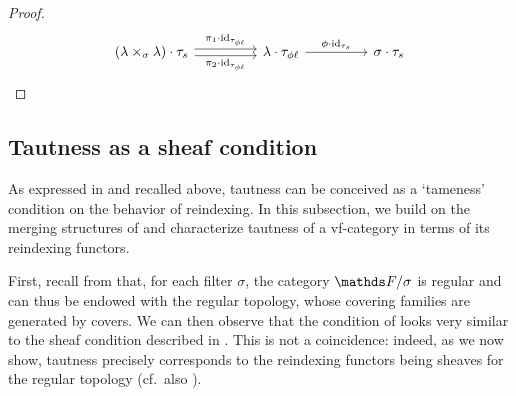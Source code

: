 \begin{prop}
\begin{proof}
\[\begin{tikzcd}[sep = 45pt]
	{(\lambda \times_\sigma \lambda)\cdot \tau_s} & {\lambda\cdot \tau_{\phi\ell}} & {\sigma\cdot \tau_s}
	\arrow["{\pi_1\cdot\operatorname{id}_{\tau_{\phi \ell}}}", shift left, from=1-1, to=1-2]
	\arrow["{\pi_2\cdot\operatorname{id}_{\tau_{\phi \ell}}}"', shift right, from=1-1, to=1-2]
	\arrow["{\phi\cdot \operatorname{id}_{\tau_s}}", from=1-2, to=1-3]
\end{tikzcd}\qedhere\]
    \end{proof}
\end{prop}

\subsection{Tautness as a sheaf condition}\label{ssec:tautness-sheaf}
As expressed in \cite{saadiaGeometricMorphismsVirtual2026} and recalled above, tautness can be conceived as a `tameness' condition on the behavior of reindexing.
In this subsection, we build on the merging structures of  and characterize tautness of a vf-category in terms of its reindexing functors. 

First, recall from  that, for each filter $\sigma$, the category $\FF/\sigma$ is regular and can thus be endowed with the regular topology, whose covering families are generated by covers. We can then observe that the condition of  looks very similar to the sheaf condition described in . This is not a coincidence: indeed, as we now show, tautness precisely corresponds to the reindexing functors being sheaves for the regular topology (cf.\ also \cite[Rem.\ 1.7]{saadiaGeometricMorphismsVirtual2026}). 

